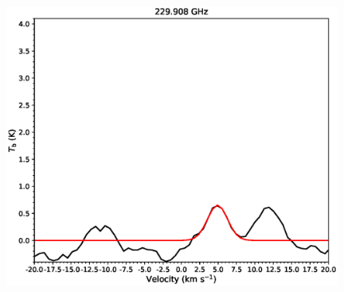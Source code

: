 \begin{figure}[H]
\begin{center}
\begin{minipage}{0.98\textwidth}
\begin{center}
\begin{minipage}{0.48\textwidth}
\begin{center}
\includegraphics[width=0.98\textwidth]{OrionKL/spectrum/HC/229.908118w_fit.eps}
\end{center}
\end{minipage}
\end{center}
\end{minipage}


\end{center}
\end{figure}
